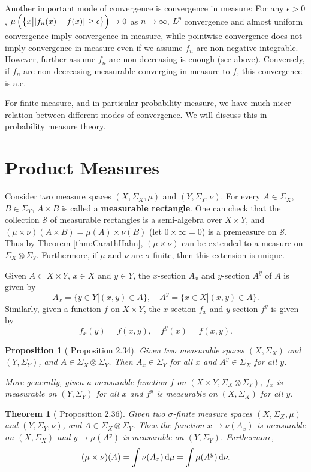 \documentclass[openany]{book}
\newtheorem{proposition}{Proposition}[chapter]
\newtheorem{theorem}{Theorem}[chapter]
\theoremstyle{definition}
\theoremstyle{remark}
\begin{document}
Another important mode of convergence is convergence in measure: For any $\epsilon>0$, $\mu\del{\cbr{x\middle||f_n(x)-f(x)|\ge\epsilon}}\to0$ as $n\to\infty$. $L^p$ convergence and almost uniform convergence imply convergence in measure, while pointwise convergence does not imply convergence in measure even if we assume $f_n$ are non-negative integrable. However, further assume $f_n$ are non-decreasing is enough (see above). Conversely, if $f_n$ are non-decreasing measurable converging in measure to $f$, this convergence is a.e.

For finite measure, and in particular probability measure, we have much nicer relation between different modes of convergence. We will discuss this in probability measure theory.

\section{Product Measures}
Consider two measure spaces $(X,\Sigma_X,\mu)$ and $(Y,\Sigma_Y,\nu)$. For every $A\in\Sigma_X$, $B\in\Sigma_Y$, $A\times B$ is called a \textbf{measurable rectangle}. One can check that the collection $\mathcal{S}$ of measurable rectangles is a semi-algebra over $X\times Y$, and $(\mu\times\nu)(A\times B)=\mu(A)\times\nu(B)$ (let $0\times\infty=0$) is a premeasure on $\mathcal{S}$. Thus by Theorem \ref{thm:CarathHahn}, $(\mu\times\nu)$ can be extended to a measure on $\Sigma_X\otimes\Sigma_Y$. Furthermore, if $\mu$ and $\nu$ are $\sigma$-finite, then this extension is unique.

Given $A\subset X\times Y$, $x\in X$ and $y\in Y$, the $x$-section $A_x$ and $y$-section $A^y$ of $A$ is given by
\begin{equation*}
    A_x=\{y\in Y|(x,y)\in A\},\quad A^y=\{x\in X|(x,y)\in A\}.
\end{equation*}
Similarly, given a function $f$ on $X\times Y$, the $x$-section $f_x$ and $y$-section $f^y$ is given by
\begin{equation*}
    f_x(y)=f(x,y),\quad f^y(x)=f(x,y).
\end{equation*}
\begin{proposition}[\cite{F13} Proposition 2.34]
    Given two measurable spaces $(X,\Sigma_X)$ and $(Y,\Sigma_Y)$, and $A\in\Sigma_X\otimes\Sigma_Y$. Then $A_x\in\Sigma_Y$ for all $x$ and $A^y\in\Sigma_X$ for all $y$.

    More generally, given a measurable function $f$ on $(X\times Y,\Sigma_X\otimes\Sigma_Y)$, $f_x$ is measurable on $(Y,\Sigma_Y)$ for all $x$ and $f^y$ is measurable on $(X,\Sigma_X)$ for all $y$.
\end{proposition}
\begin{theorem}[\cite{F13} Proposition 2.36]
    Given two $\sigma$-finite measure spaces $(X,\Sigma_X,\mu)$ and $(Y,\Sigma_Y,\nu)$, and $A\in\Sigma_X\otimes\Sigma_Y$. Then the function $x\to\nu(A_x)$ is measurable on $(X,\Sigma_X)$ and $y\to\mu(A^y)$ is measurable on $(Y,\Sigma_Y)$. Furthermore,
    \begin{equation*}
        (\mu\times\nu)(A)=\int\nu(A_x)\dif\mu=\int\mu(A^y)\dif\nu.
    \end{equation*}
\end{theorem}
\end{document}
